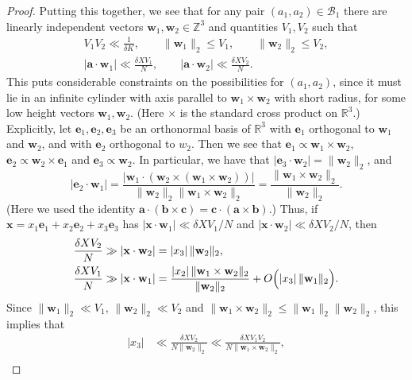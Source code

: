 \documentclass[10pt]{amsart}
\theoremstyle{plain}
\numberwithin{sblmm}{thrm}
\numberwithin{equation}{section}
\begin{document}
\begin{proof}
Putting this together, we see that for any pair $(a_1,a_2)\in\mathcal{B}_1$ there are linearly independent vectors $\mathbf{w}_1,\mathbf{w}_2\in\mathbb{Z}^3$ and quantities $V_1,V_2$ such that
\begin{align*}
V_1V_2\ll \frac{1}{\delta K},\qquad \|\mathbf{w}_1\|_2\le V_1,\qquad \|\mathbf{w}_2\|_2\le V_2,\\
|\mathbf{a}\cdot \mathbf{w}_1|\ll \frac{\delta X V_1}{N},\qquad |\mathbf{a}\cdot \mathbf{w}_2|\ll \frac{\delta X V_2}{N}.
\end{align*}
This puts considerable constraints on the possibilities for $(a_1,a_2)$, since it must lie in an infinite cylinder with axis parallel to $\mathbf{w}_1\times\mathbf{w}_2$ with short radius, for some low height vectors $\mathbf{w}_1,\mathbf{w}_2$. (Here $\times$ is the standard cross product on $\mathbb{R}^3$.) Explicitly, let $\mathbf{e}_1,\mathbf{e}_2,\mathbf{e}_3$ be an orthonormal basis of $\mathbb{R}^3$ with $\mathbf{e}_1$ orthogonal to $\mathbf{w}_1$ and $\mathbf{w}_2$, and with $\mathbf{e}_2$ orthogonal to $w_2$. Then we see that $\mathbf{e}_1\propto \mathbf{w}_1\times\mathbf{w}_2$, $\mathbf{e}_2\propto \mathbf{w}_2\times \mathbf{e}_1$ and $\mathbf{e}_3\propto \mathbf{w}_2$. In particular, we have that $|\mathbf{e}_3\cdot \mathbf{w}_2|=\|\mathbf{w}_2\|_2$, and
\[
|\mathbf{e}_2\cdot \mathbf{w}_1|=\frac{|\mathbf{w}_1\cdot (\mathbf{w}_2\times(\mathbf{w}_1\times\mathbf{w}_2))|}{\|\mathbf{w}_2\|_2\|\mathbf{w}_1\times\mathbf{w}_2\|_2}=\frac{\|\mathbf{w}_1\times\mathbf{w}_2\|_2}{\|\mathbf{w}_2\|_2}.
\]
(Here we used the identity $\mathbf{a}\cdot (\mathbf{b}\times \mathbf{c})=\mathbf{c}\cdot(\mathbf{a}\times\mathbf{b})$.) Thus, if $\mathbf{x}=x_1\mathbf{e}_1+x_2\mathbf{e}_2+x_3\mathbf{e}_3$ has $|\mathbf{x}\cdot \mathbf{w}_1|\ll \delta X V_1/N$ and $|\mathbf{x}\cdot \mathbf{w}_2|\ll \delta X V_2/N$, then
\begin{align*}
\frac{\delta X V_2}{N}&\gg |\mathbf{x}\cdot \mathbf{w}_2|=|x_3|\,\|\mathbf{w}_2\|_2,\\
\frac{\delta X V_1}{N}&\gg |\mathbf{x}\cdot \mathbf{w}_1|=\frac{|x_2|\,\|\mathbf{w}_1\times \mathbf{w}_2\|_2}{\|\mathbf{w}_2\|_2}+O\Bigl(|x_3|\, \|\mathbf{w}_1\|_2\Bigr).
\end{align*}
Since $\|\mathbf{w}_1\|_2\ll V_1$, $\|\mathbf{w}_2\|_2\ll V_2$ and $\|\mathbf{w}_1\times\mathbf{w}_2\|_2\le \|\mathbf{w}_1\|_2\|\mathbf{w}_2\|_2$, this implies that
\begin{align*}
|x_3|&\ll \frac{\delta X V_2}{N\|\mathbf{w}_2\|_2}\ll \frac{\delta X V_1 V_2}{N \|\mathbf{w}_1\times \mathbf{w}_2\|_2},\\

\end{align*}
\end{proof}
\end{document}
